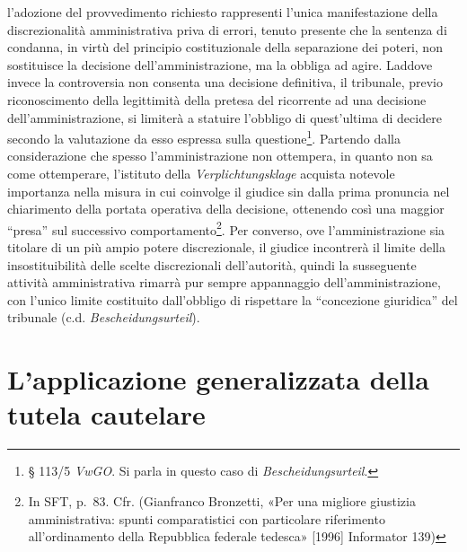 \documentclass[12pt,it,a4paper,]{report}
\begin{document}
l'adozione del provvedimento richiesto rappresenti l'unica
manifestazione della discrezionalità amministrativa priva di errori,
tenuto presente che la sentenza di condanna, in virtù del principio
costituzionale della separazione dei poteri, non sostituisce la
decisione dell'amministrazione, ma la obbliga ad agire. Laddove invece
la controversia non consenta una decisione definitiva, il tribunale,
previo riconoscimento della legittimità della pretesa del ricorrente ad
una decisione dell'amministrazione, si limiterà a statuire l'obbligo di
quest'ultima di decidere secondo la valutazione da esso espressa sulla
questione\footnote{§ 113/5 \emph{VwGO}. Si parla in questo caso di
  \emph{Bescheidungsurteil}.}. Partendo dalla considerazione che spesso
l'amministrazione non ottempera, in quanto non sa come ottemperare,
l'istituto della \emph{Verplichtungsklage} acquista notevole importanza
nella misura in cui coinvolge il giudice sin dalla prima pronuncia nel
chiarimento della portata operativa della decisione, ottenendo così una
maggior ``presa'' sul successivo comportamento\footnote{In SFT, p.~83.
  Cfr. (Gianfranco Bronzetti, {«Per una migliore giustizia
  amministrativa: spunti comparatistici con particolare riferimento
  all'ordinamento della Repubblica federale tedesca»} {[}1996{]}
  Informator 139)}. Per converso, ove l'amministrazione sia titolare di
un più ampio potere discrezionale, il giudice incontrerà il limite della
insostituibilità delle scelte discrezionali dell'autorità, quindi la
susseguente attività amministrativa rimarrà pur sempre appannaggio
dell'amministrazione, con l'unico limite costituito dall'obbligo di
rispettare la ``concezione giuridica'' del tribunale (c.d.
\emph{Bescheidungsurteil}).

\hypertarget{lapplicazione-generalizzata-della-tutela-cautelare}{%
\section{L'applicazione generalizzata della tutela
cautelare}\label{lapplicazione-generalizzata-della-tutela-cautelare}}
\end{document}
